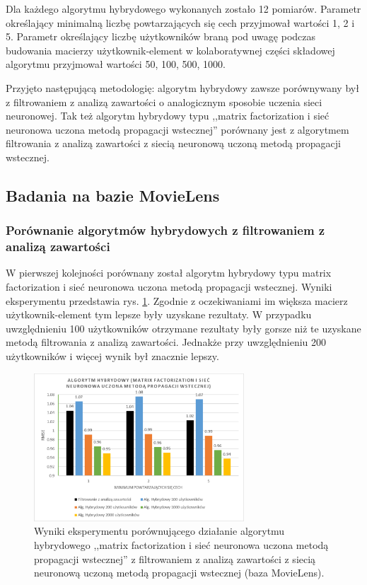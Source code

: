 \documentclass[twoside]{iisthesis}
\begin{document}
		Dla każdego algorytmu hybrydowego wykonanych zostało 12 pomiarów. Parametr określający minimalną liczbę powtarzających się cech przyjmował wartości 1, 2 i 5. Parametr określający liczbę użytkowników braną pod uwagę podczas budowania macierzy użytkownik-element w kolaboratywnej części składowej algorytmu przyjmował wartości 50, 100, 500, 1000. 
		
		Przyjęto następującą metodologię: algorytm hybrydowy zawsze porównywany był z filtrowaniem z analizą zawartości o analogicznym sposobie uczenia sieci neuronowej. Tak też algorytm hybrydowy typu ,,matrix factorization i sieć neuronowa uczona metodą propagacji wstecznej'' porównany jest z algorytmem filtrowania z analizą zawartości z siecią neuronową uczoną metodą propagacji wstecznej.
		
		\subsection{Badania na bazie MovieLens}
				
		\subsubsection{Porównanie algorytmów hybrydowych z filtrowaniem z analizą zawartości}
		
		W pierwszej kolejności porównany został algorytm hybrydowy typu matrix  factorization i sieć neuronowa uczona metodą propagacji wstecznej. Wyniki eksperymentu przedstawia rys. \ref{fig:ml_exphybrid1_1}. Zgodnie z oczekiwaniami im większa macierz użytkownik-element tym lepsze były uzyskane rezultaty. W przypadku uwzględnieniu 100 użytkowników otrzymane rezultaty były gorsze niż te uzyskane metodą filtrowania z analizą zawartości. Jednakże przy uwzględnieniu 200 użytkowników i więcej wynik był znacznie lepszy. 
		
		\begin{figure}
			\centering
			\includegraphics[width=0.7\textwidth]{ml_exphybrid1_1}			
			\caption{Wyniki eksperymentu porównującego działanie algorytmu hybrydowego ,,matrix factorization i sieć neuronowa uczona metodą propagacji wstecznej'' z filtrowaniem z analizą zawartości z siecią neuronową uczoną metodą propagacji wstecznej (baza MovieLens).}
			\label{fig:ml_exphybrid1_1}
		\end{figure}
	
\end{document}
